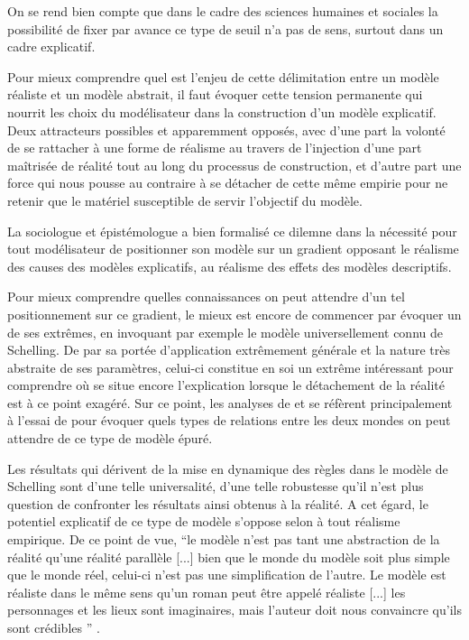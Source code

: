 On se rend bien compte que dans le cadre des sciences humaines et sociales la possibilité de fixer par avance ce type de seuil n'a pas de sens, surtout dans un cadre explicatif.


Pour mieux comprendre quel est l'enjeu de cette délimitation entre un modèle réaliste et un modèle abstrait, il faut évoquer cette tension permanente qui nourrit les choix du modélisateur dans la construction d'un modèle explicatif. Deux attracteurs possibles et apparemment opposés, avec d'une part la volonté de se rattacher à une forme de réalisme au travers de l'injection d'une part maîtrisée de réalité tout au long du processus de construction, et d'autre part une force qui nous pousse au contraire à se détacher de cette même empirie pour ne retenir que le matériel susceptible de servir l'objectif du modèle.

La sociologue et épistémologue \textcite{Bulle2005} a bien formalisé ce dilemne dans la nécessité pour tout modélisateur de positionner son modèle sur un gradient opposant le réalisme des causes des modèles explicatifs, au réalisme des effets des modèles descriptifs.

Pour mieux comprendre quelles connaissances on peut attendre d'un tel positionnement sur ce gradient, le mieux est encore de commencer par évoquer un de ses extrêmes, en invoquant par exemple le modèle universellement connu de Schelling. De par sa portée d'application extrêmement générale et la nature très abstraite de ses paramètres, celui-ci constitue en soi un extrême intéressant pour comprendre où se situe encore l'explication lorsque le détachement de la réalité est à ce point exagéré. Sur ce point, les analyses de \textcite{Bulle2005} et \textcites{Phan2008, Phan2010} se réfèrent principalement à l'essai de \textcite{Sugden2002} pour évoquer quels types de relations entre les deux mondes on peut attendre de ce type de modèle épuré.

Les résultats qui dérivent de la mise en dynamique des règles dans le modèle de Schelling sont d'une telle universalité, d'une telle robustesse qu'il n'est plus question de confronter les résultats ainsi obtenus à la réalité. A cet égard, le potentiel explicatif de ce type de modèle s'oppose selon \textcite{Bulle2005} à tout réalisme empirique. De ce point de vue, \enquote{le modèle n'est pas tant une abstraction de la réalité qu’une réalité parallèle [...] bien que le monde du modèle soit plus simple que le monde réel, celui-ci n'est pas une simplification de l'autre. Le modèle est réaliste dans le même sens qu'un roman peut être appelé réaliste [...] les personnages et les lieux sont imaginaires, mais l'auteur doit nous convaincre qu'ils sont crédibles } \autocites[131]{Sugden2002}[10]{Phan2008}.

